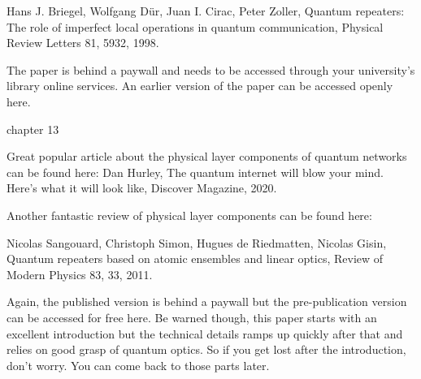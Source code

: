 Hans J. Briegel, Wolfgang Dür, Juan I. Cirac, Peter Zoller, Quantum repeaters: The role of imperfect local operations in quantum communication, Physical Review Letters 81, 5932, 1998.

The paper is behind a paywall and needs to be accessed through your university’s library online services. An earlier version of the paper can be accessed openly here.

chapter 13

Great popular article about the physical layer components of quantum networks can be found here:
Dan Hurley, The quantum internet will blow your mind. Here’s what it will look like, Discover Magazine, 2020.

Another fantastic review of physical layer components can be found here:

Nicolas Sangouard, Christoph Simon, Hugues de Riedmatten, Nicolas Gisin, Quantum repeaters based on atomic ensembles and linear optics, Review of Modern Physics 83, 33, 2011.

Again, the published version is behind a paywall but the pre-publication version can be accessed for free here. Be warned though, this paper starts with an excellent introduction but the technical details ramps up quickly after that and relies on good grasp of quantum optics. So if you get lost after the introduction, don’t worry. You can come back to those parts later.
